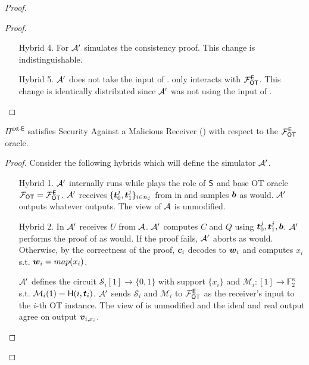 \begin{proof}
\begin{proof}
\begin{enumerate}[leftmargin=1.8cm]
			\item[Hybrid 4.] For  $\mathcal{A}'$ simulates the consistency proof. This change is indistinguishable. 
			
			\item[Hybrid 5.] $\mathcal{A}'$ does not take the input of \rec. \rec only interacts with $\mathcal{F}_{\mathsf{OT}}^\mathsf{E}$. This change is identically distributed since $\mathcal{A}'$ was not using the input of \rec.
		\end{enumerate}
	\end{proof}

	\begin{claim}\label{claim:ext-E-MalReceiver}
	$\Pi^\textsf{ext-E}$ satisfies Security Against a Malicious Receiver () with respect to the $\mathcal{F}_{\mathsf{OT}}^\mathsf{E}$ oracle.
	\end{claim}
	\begin{proof}
				Consider the following hybrids which will define the simulator $\mathcal{A}'$. 
		\begin{enumerate}[leftmargin=1.8cm]
			\item[Hybrid 1.] $\mathcal{A}'$ internally runs \Adv while plays the role of $\mathsf{S}$ and base OT oracle $\mathcal{F}_{\mathsf{OT}}=\mathcal{F}_{\mathsf{OT}}^\mathsf{E}$. $\mathcal{A}'$ receives $\{\boldsymbol{t}^j_0,\boldsymbol{t}^j_1\}_{i\in{n_\mathcal{C}}}$ from \Adv in  and samples $\boldsymbol{b}$ as \send would. $\mathcal{A}'$ outputs whatever \Adv outputs. The view of $\mathcal{A}$ is unmodified.
			
			\item[Hybrid 2.] In  $\mathcal{A}'$ receives $U$ from $\mathcal{A}$.  $\mathcal{A}'$ computes $C$ and $Q$ using $\boldsymbol{t}_0^j,\boldsymbol{t}_1^j,\boldsymbol{b}$. $\mathcal{A}'$ performs the proof of  as \send would. If the proof fails, $\mathcal{A}'$ aborts as \send would. Otherwise, by the correctness of the proof, $\boldsymbol{c}_i$ decodes to $\boldsymbol{w}_i$  and computes $x_i$ s.t. $\boldsymbol{w}_i=map(x_i)$.
			
			$\mathcal{A}'$ defines the circuit $\mathcal{S}_i[1]\rightarrow\{0,1\}$ with support $\{x_i\}$ and $\mathcal{M}_i:[1]\rightarrow\mathbb{F}^\kappa_2$ s.t. $\mathcal{M}_i(1)=\mathsf{H}(i, \boldsymbol{t}_i)$. $\mathcal{A}'$ sends $\mathcal{S}_i$ and $\mathcal{M}_i$ to $\mathcal{F}_{\mathsf{OT}}^\mathsf{E}$ as the receiver's input to the $i$-th OT instance. The view of \Adv is unmodified and the ideal and real output agree on output $\boldsymbol{v}_{i,x_i}$.
			

\end{enumerate}
\end{proof}
\end{proof}
